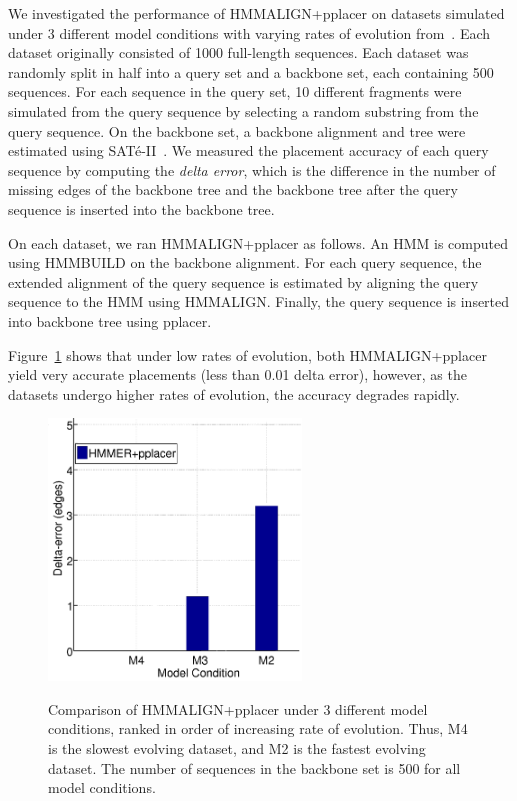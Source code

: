We investigated the performance of HMMALIGN+pplacer on datasets simulated under 3 different model conditions
with varying rates of evolution from~\cite{Liu2011}.  Each dataset originally consisted of 1000 full-length sequences.  Each dataset was randomly split in half into a query set and a backbone set, each containing 500 sequences.  For each sequence in the query set, 10 different fragments were simulated from the query sequence by selecting a random substring from the query sequence.  On the backbone set, a backbone alignment and tree were estimated using SAT\'{e}-II~\cite{Liu2011}.  We measured the placement accuracy of each query sequence by computing the \emph{delta error}, which is the difference in the number of missing edges of the backbone tree and the backbone tree after the query sequence is inserted into the backbone tree.  

On each dataset, we ran HMMALIGN+pplacer as follows.  An HMM is computed using HMMBUILD on the backbone alignment.  For each query sequence, the extended alignment of the query sequence is estimated by aligning the query sequence to the HMM using HMMALIGN.  Finally, the query sequence is inserted into backbone tree using pplacer.

Figure~\ref{sepp:initial} shows that under
low rates of evolution, both HMMALIGN+pplacer yield very accurate
placements (less than 0.01 delta error), however, as the datasets undergo higher rates of evolution, the accuracy degrades rapidly.

\begin{figure}[htbp]
\centering
{\includegraphics[width=0.60\textwidth]{hmmfamily/hmmer_pplacer}}
\caption[HMMALIGN+pplacer on datasets of varying rates of evolution.]{Comparison of HMMALIGN+pplacer under 3 different model conditions, ranked in order of increasing rate of evolution.  Thus, M4 is the slowest evolving dataset, and M2 is the fastest evolving dataset.  The number of sequences in the backbone set is 500 for all model conditions.} 
\label{sepp:initial}
\end{figure}

